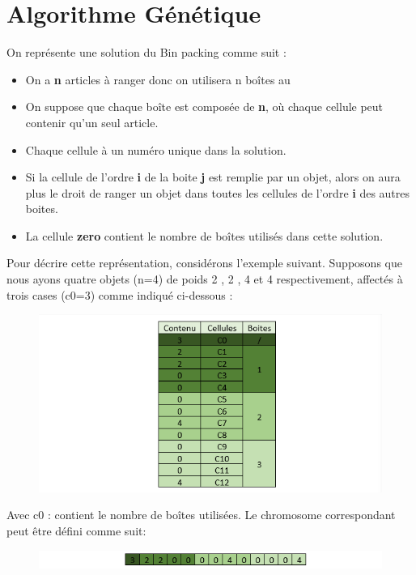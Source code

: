 \documentclass{article}
\begin{document}
\section{Algorithme Génétique}
On représente une solution du Bin packing comme suit : 
\begin{itemize}
	\item On a \textbf{n} articles à ranger donc on utilisera n boîtes au 
	\item On suppose que chaque boîte est composée de \textbf{n}, où chaque cellule peut contenir qu’un seul article.
	\item Chaque cellule à un numéro unique dans la solution.
	\item Si la cellule de l’ordre \textbf{i} de la boite \textbf{j} est remplie par un objet, alors on aura plus le droit de ranger un objet dans toutes les cellules de l’ordre \textbf{i} des autres boites.
	\item La cellule \textbf{zero} contient le nombre de boîtes utilisés dans cette solution.
\end{itemize}
Pour décrire cette représentation, considérons l'exemple suivant. Supposons que nous ayons quatre objets (n=4) de poids 2 , 2 , 4 et 4 respectivement, affectés à trois cases (c0=3)  comme indiqué ci-dessous :
\begin{figure}[H]
  \includegraphics[width=\linewidth]{../figures/pic01.PNG}
\end{figure}
Avec c0 : contient le nombre de boîtes utilisées.
\newline
Le chromosome correspondant peut être défini comme suit:
\begin{figure}[H]
  \includegraphics[width=\linewidth]{../figures/pic02.PNG}
\end{figure}
\end{document}
